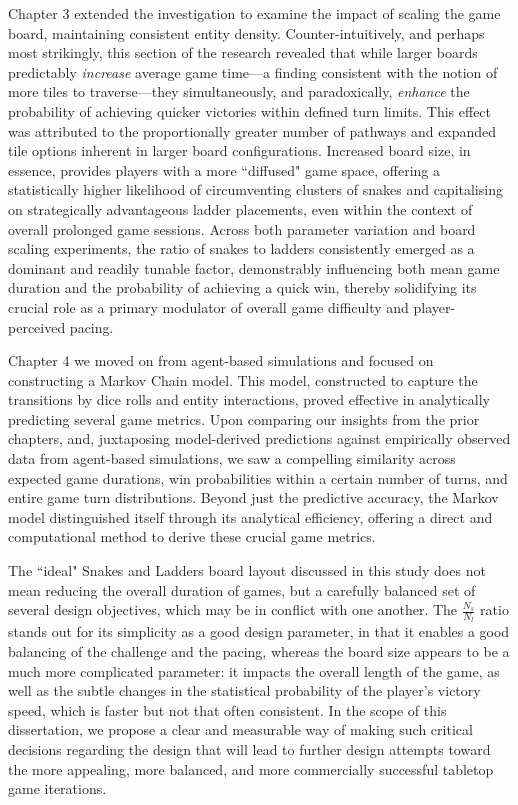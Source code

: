Chapter 3 extended the investigation to examine the impact of scaling the game board, maintaining consistent entity density. Counter-intuitively, and perhaps most strikingly, this section of the research revealed that while larger boards predictably \textit{increase} average game time—a finding consistent with the notion of more tiles to traverse—they simultaneously, and paradoxically, \textit{enhance} the probability of achieving quicker victories within defined turn limits.  This effect was attributed to the proportionally greater number of pathways and expanded tile options inherent in larger board configurations.  Increased board size, in essence, provides players with a more ``diffused" game space, offering a statistically higher likelihood of circumventing clusters of snakes and capitalising on strategically advantageous ladder placements, even within the context of overall prolonged game sessions.  Across both parameter variation and board scaling experiments, the ratio of snakes to ladders consistently emerged as a dominant and readily tunable factor, demonstrably influencing both mean game duration and the probability of achieving a quick win, thereby solidifying its crucial role as a primary modulator of overall game difficulty and player-perceived pacing.

Chapter 4 we moved on from agent-based simulations and focused on constructing a Markov Chain model. This model, constructed to capture the transitions by dice rolls and entity interactions, proved effective in analytically predicting several game metrics.  Upon comparing our insights from the prior chapters, and, juxtaposing model-derived predictions against empirically observed data from agent-based simulations, we saw a compelling similarity across expected game durations, win probabilities within a certain number of turns, and entire game turn distributions.  Beyond just the predictive accuracy, the Markov model distinguished itself through its analytical efficiency, offering a direct and computational method to derive these crucial game metrics. 

The ``ideal" Snakes and Ladders board layout discussed in this study does not mean reducing the overall duration of games, but a carefully balanced set of several design objectives, which may be in conflict with one another. The $\frac{N_s}{N_l}$ ratio stands out for its simplicity as a good design parameter, in that it enables a good balancing of the challenge and the pacing, whereas the board size appears to be a much more complicated parameter: it impacts the overall length of the game, as well as the subtle changes in the statistical probability of the player's victory speed, which is faster but not that often consistent. In the scope of this dissertation, we propose a clear and measurable way of making such critical decisions regarding the design that will lead to further design attempts toward the more appealing, more balanced, and more commercially successful tabletop game iterations.

